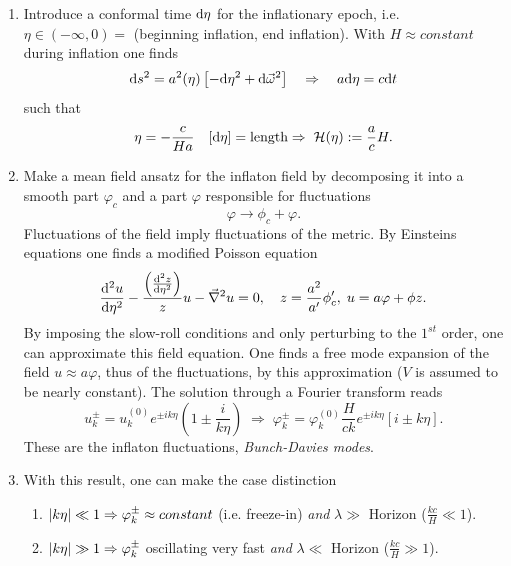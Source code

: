 \begin{enumerate}
	\item Introduce a conformal time $\mathrm{d} \eta$ for the inflationary epoch, i.e. $\eta \in (-\infty,0)=$ (beginning inflation, end inflation). With $H\approx constant$ during inflation one finds
	\begin{equation*}
		\mathrm{d} s^2 = a^2(\eta) \left[-\mathrm{d} \eta^2 + \mathrm{d} \vec{\omega}^2\right] \quad \Rightarrow \quad a \mathrm{d} \eta = c \mathrm{d} t
	\end{equation*}
	such that
	\begin{equation*}
		\eta = - \frac{c}{H a} \quad [\mathrm{d} \eta] = \text{length} \Rightarrow \; \mathcal{H} (\eta):= \frac{a}{c} H.
	\end{equation*}
\item Make a mean field ansatz for the inflaton field by decomposing it into a smooth part $\varphi_c$ and a part $\varphi$ responsible for fluctuations
\begin{equation}
	\varphi \rightarrow \phi_c + \varphi.
\end{equation}
Fluctuations of the field imply fluctuations of the metric. By Einsteins equations one finds a modified Poisson equation
\begin{equation}
	\frac{\mathrm{d}^2 u}{\mathrm{d} \eta^2} - \frac{\left(\frac{\mathrm{d}^2 z}{\mathrm{d} \eta^2}\right)}{z} u - \vec{\nabla}^2 u = 0,\quad z= \frac{a^2}{a^\prime}\phi^\prime_c,\; u=a \varphi + \phi z.
\end{equation}
By imposing the slow-roll conditions and only perturbing to the $1^{st}$ order, one can approximate this field equation. One finds a free mode expansion of the field $u\approx a \varphi$, thus of the fluctuations, by this approximation ($V$ is assumed to be nearly constant). The solution through a Fourier transform reads
\begin{equation*}
	u^\pm_k = u^{(0)}_k e^{\pm i k \eta} \left(1 \pm \frac{i}{k \eta}\right) \; \Rightarrow \; \varphi^\pm_k = \varphi^{(0)}_k \frac{H}{ck} e^{\pm i k \eta} \left[i \pm k \eta\right].
\end{equation*}
These are the inflaton fluctuations, \emph{Bunch-Davies modes}.
\item With this result, one can make the case distinction
\begin{mybox}{}
	\begin{enumerate}
		\item $\abs{k \eta} \ll 1 \Rightarrow \varphi^\pm_k\approx constant$ (i.e. freeze-in) \emph{and} $\lambda \gg$ Horizon ($\frac{k c}{H} \ll 1$).
		\item $\abs{k \eta} \gg 1 \Rightarrow \varphi^\pm_k$ oscillating very fast \emph{and} $\lambda \ll$ Horizon ($\frac{k c}{H} \gg 1$).

\end{enumerate}
\end{mybox}
\end{enumerate}

